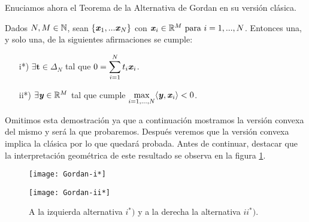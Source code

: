 \bigskip
Enuciamos ahora el Teorema de la Alternativa de Gordan en su versión clásica.
\bigskip
\begin{teoremaBox}\label{GordanClasic}
	Dados $N, M \in \mathbb{N}   $, sean $ \{\textbf{\emph{x}}_1,...\textbf{\emph{x}}_N\}$ con $ \textbf{\emph{x}}_i \in \mathbb{R}^M \text{ para } i=1,...,N$. Entonces una, y solo una, de la siguientes afirmaciones se cumple:
	
	\begin{itemize}
		\item[i*)] $ \exists \mathbf{t} \in \Delta_N $ tal que  $  0 = \displaystyle \sum_{i=1}^{N}{t_i \textbf{\emph{x}}_i}$.
		\item[ii*)] $ \exists \textbf{\emph{y}} \in \mathbb{R}^M $ tal que cumple $ \displaystyle \max_{i=1,...,N} \langle \textbf{\emph{y}}, \textbf{\emph{x}}_i \rangle < 0 $.
	\end{itemize}
\end{teoremaBox}
\bigskip
Omitimos esta demostración ya que a continuación mostramos la versión convexa del mismo y será la que probaremos. Después veremos que la versión convexa  implica la clásica por lo que quedará probada. Antes de continuar, destacar que la interpretación geométrica de este resultado se observa en la figura \ref{fig:gordan-clasic}.

\begin{figure}[h!]
	\begin{minipage}{0.5\textwidth}
		\centering
		\texttt{[image: Gordan-i*]} 
	\end{minipage}
	\begin{minipage}{0.5\textwidth}
		\texttt{[image: Gordan-ii*]}
	\end{minipage}
	\caption{A la izquierda alternativa $ i^*) $ y a la derecha la alternativa $ ii^*) $.}
	\label{fig:gordan-clasic}
\end{figure}

